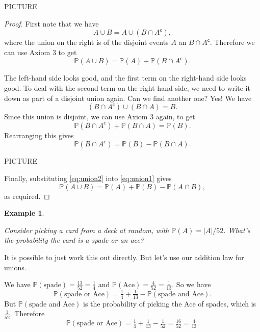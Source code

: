 \documentclass[
  a4paper,
]{book}
\theoremstyle{definition}
\theoremstyle{definition}
\newtheorem{example}{Example}[chapter]
\theoremstyle{definition}
\theoremstyle{remark}
\begin{document}
PICTURE

\begin{proof}

First note that we have
\[ A \cup B = A \cup (B \cap A^\mathsf{c}) , \]
where the union on the right is of the disjoint events \(A\) an \(B \cap A^\mathsf{c}\). Therefore we can use Axiom 3 to get
\begin{equation}
\mathbb P(A \cup B) = \mathbb P(A) + \mathbb P(B \cap A^\mathsf{c}) .    \label{eq:union1}
\end{equation}

The left-hand side looks good, and the first term on the right-hand side looks good. To deal with the second term on the right-hand side, we need to write it down as part of a disjoint union again. Can we find another one? Yes! We have
\[ (B \cap A^\mathsf{c}) \cup (B \cap A) = B .\]
Since this union is disjoint, we can use Axiom 3 again, to get
\[ \mathbb P(B \cap A^\mathsf{c}) + \mathbb P(B \cap A) = \mathbb P(B) . \]
Rearranging this gives
\begin{equation}
\mathbb P(B \cap A^\mathsf{c}) = \mathbb P(B) - \mathbb P(B \cap A).  \label{eq:union2}
\end{equation}

PICTURE

Finally, substituting \eqref{eq:union2} into \eqref{eq:union1} gives
\[ \mathbb P(A \cup B) = \mathbb P(A) + \mathbb P(B) - \mathbb P(A \cap B) , \]
as required.

\end{proof}

\begin{example}
\protect\hypertarget{exm:unlabeled-div-18}{}\label{exm:unlabeled-div-18}

\emph{Consider picking a card from a deck at random, with \(\mathbb P(A) = |A|/52\). What's the probability the card is a spade or an ace?}

It is possible to just work this out directly. But let's use our addition law for unions.

We have \(\mathbb P(\text{spade}) = \frac{13}{52} = \frac{1}{4}\) and \(\mathbb P(\text{Ace}) = \frac{4}{52} = \frac{1}{13}\). So we have
\[ \mathbb P(\text{spade or Ace}) = \tfrac14 + \tfrac{1}{13} - \mathbb P(\text{spade and Ace}) . \]
But \(\mathbb P(\text{spade and Ace})\) is the probability of picking the Ace of spades, which is \(\frac{1}{52}\). Therefore
\[ \mathbb P(\text{spade or Ace}) = \tfrac14 + \tfrac{1}{13} - \tfrac{1}{52} = \tfrac{16}{52} = \tfrac{4}{13} . \]

\end{example}
\end{document}

